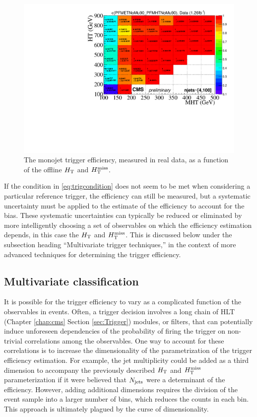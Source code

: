 \begin{figure}[tb!]
  \begin{center}
    \includegraphics[width=0.95\linewidth]{figures/trigger/MonojetTrigger_EfficiencyData.pdf}
    \caption{
      The monojet trigger efficiency, measured in real data, as a function of the offline $H_{\rm T}$
      and $H_{\text{T}}^{\rm miss}$. }
    \label{fig:2dMonoEff}
  \end{center}
\end{figure}


If the condition in \ref{eq:trigcondition} does not seem to be met when considering a particular reference trigger, the efficiency can still be measured, but a systematic uncertainty must be applied to the estimate of the efficiency to account for the bias. These systematic uncertainties can typically be reduced or eliminated by more intelligently choosing a set of observables on which the efficiency estimation depends, in this case the $H_{\rm T}$ and $H_{\text{T}}^{\rm miss}$. This is discussed below under the subsection heading ``Multivariate trigger techniques,'' in the context of more advanced techniques for determining the trigger efficiency. 
 \FloatBarrier
 
\subsection{Multivariate classification}
\label{sec:mvatrigger}
It is possible for the trigger efficiency to vary as a complicated function of the observables in events. Often, a trigger decision involves a long chain of HLT (Chapter \ref{chap:cms} Section \ref{sec:Trigger}) modules, or filters, that can potentially induce unforeseen dependencies of the probability of firing the trigger on non-trivial correlations among the observables. One way to account for these correlations is to increase the dimensionality of the parametrization of the trigger efficiency estimation. For example, the jet multiplicity could be added as a third dimension to accompany the previously described $H_{\rm T}$ and $H_{\text{T}}^{\rm miss}$ parameterization if it were believed that $N_{\rm jets}$ were a determinant of the efficiency. However, adding additional dimensions requires the division of the event sample into a larger number of bins, which reduces the counts in each bin. This approach is ultimately plagued by the curse of dimensionality.

